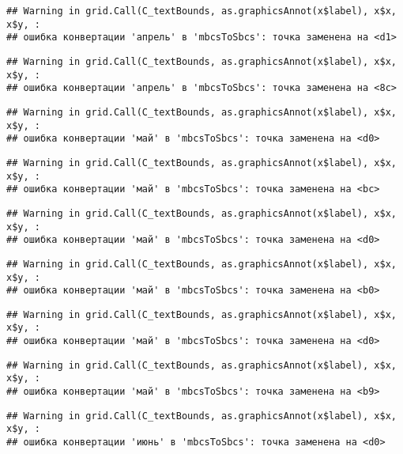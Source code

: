 \documentclass[
]{article}
\begin{document}
\begin{verbatim}
## Warning in grid.Call(C_textBounds, as.graphicsAnnot(x$label), x$x, x$y, :
## ошибка конвертации 'апрель' в 'mbcsToSbcs': точка заменена на <d1>
\end{verbatim}

\begin{verbatim}
## Warning in grid.Call(C_textBounds, as.graphicsAnnot(x$label), x$x, x$y, :
## ошибка конвертации 'апрель' в 'mbcsToSbcs': точка заменена на <8c>
\end{verbatim}

\begin{verbatim}
## Warning in grid.Call(C_textBounds, as.graphicsAnnot(x$label), x$x, x$y, :
## ошибка конвертации 'май' в 'mbcsToSbcs': точка заменена на <d0>
\end{verbatim}

\begin{verbatim}
## Warning in grid.Call(C_textBounds, as.graphicsAnnot(x$label), x$x, x$y, :
## ошибка конвертации 'май' в 'mbcsToSbcs': точка заменена на <bc>
\end{verbatim}

\begin{verbatim}
## Warning in grid.Call(C_textBounds, as.graphicsAnnot(x$label), x$x, x$y, :
## ошибка конвертации 'май' в 'mbcsToSbcs': точка заменена на <d0>
\end{verbatim}

\begin{verbatim}
## Warning in grid.Call(C_textBounds, as.graphicsAnnot(x$label), x$x, x$y, :
## ошибка конвертации 'май' в 'mbcsToSbcs': точка заменена на <b0>
\end{verbatim}

\begin{verbatim}
## Warning in grid.Call(C_textBounds, as.graphicsAnnot(x$label), x$x, x$y, :
## ошибка конвертации 'май' в 'mbcsToSbcs': точка заменена на <d0>
\end{verbatim}

\begin{verbatim}
## Warning in grid.Call(C_textBounds, as.graphicsAnnot(x$label), x$x, x$y, :
## ошибка конвертации 'май' в 'mbcsToSbcs': точка заменена на <b9>
\end{verbatim}

\begin{verbatim}
## Warning in grid.Call(C_textBounds, as.graphicsAnnot(x$label), x$x, x$y, :
## ошибка конвертации 'июнь' в 'mbcsToSbcs': точка заменена на <d0>
\end{verbatim}
\end{document}
